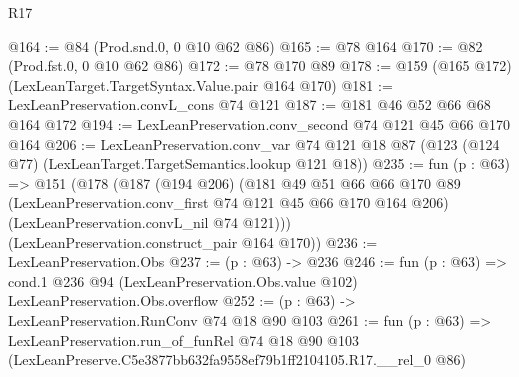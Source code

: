 \begin{lexlean}{R17}
\begin{coremodule}
@164 := @84 (Prod.snd.{0, 0} @10 @62 @86)
@165 := @78 @164
@170 := @82 (Prod.fst.{0, 0} @10 @62 @86)
@172 := @78 @170 @89
@178 := @159 (@165 @172) (LexLeanTarget.TargetSyntax.Value.pair @164 @170)
@181 := LexLeanPreservation.convL_cons @74 @121
@187 := @181 @46 @52 @66 @68 @164 @172
@194 := LexLeanPreservation.conv_second @74 @121 @45 @66 @170 @164
@206 := LexLeanPreservation.conv_var
    @74
    @121
    @18
    @87
    (@123 (@124 @77) (LexLeanTarget.TargetSemantics.lookup @121 @18))
@235 := fun (p : @63) =>
  @151
    (@178
      (@187
        (@194 @206)
        (@181
          @49
          @51
          @66
          @66
          @170
          @89
          (LexLeanPreservation.conv_first @74 @121 @45 @66 @170 @164 @206)
          (LexLeanPreservation.convL_nil @74 @121)))
      (LexLeanPreservation.construct_pair @164 @170))
@236 := LexLeanPreservation.Obs
@237 := (p : @63) -> @236
@246 := fun (p : @63) =>
  cond.{1} @236 @94 (LexLeanPreservation.Obs.value @102) LexLeanPreservation.Obs.overflow
@252 := (p : @63) -> LexLeanPreservation.RunConv @74 @18 @90 @103
@261 := fun (p : @63) =>
  LexLeanPreservation.run_of_funRel
    @74
    @18
    @90
    @103
    (LexLeanPreserve.C5e3877bb632fa9558ef79b1ff2104105.R17.__rel_0 @86)
\end{coremodule}
\end{lexlean}
